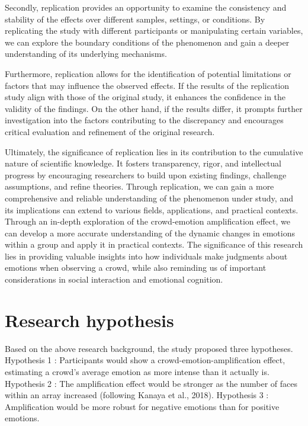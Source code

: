 \documentclass[
  man]{apa6}
\begin{document}
Secondly, replication provides an opportunity to examine the consistency and stability of the effects over different samples, settings, or conditions. By replicating the study with different participants or manipulating certain variables, we can explore the boundary conditions of the phenomenon and gain a deeper understanding of its underlying mechanisms.

Furthermore, replication allows for the identification of potential limitations or factors that may influence the observed effects. If the results of the replication study align with those of the original study, it enhances the confidence in the validity of the findings. On the other hand, if the results differ, it prompts further investigation into the factors contributing to the discrepancy and encourages critical evaluation and refinement of the original research.

Ultimately, the significance of replication lies in its contribution to the cumulative nature of scientific knowledge. It fosters transparency, rigor, and intellectual progress by encouraging researchers to build upon existing findings, challenge assumptions, and refine theories. Through replication, we can gain a more comprehensive and reliable understanding of the phenomenon under study, and its implications can extend to various fields, applications, and practical contexts.
Through an in-depth exploration of the crowd-emotion amplification effect, we can develop a more accurate understanding of the dynamic changes in emotions within a group and apply it in practical contexts. The significance of this research lies in providing valuable insights into how individuals make judgments about emotions when observing a crowd, while also reminding us of important considerations in social interaction and emotional cognition.

\hypertarget{research-hypothesis}{%
\section{Research hypothesis}\label{research-hypothesis}}

Based on the above research background, the study proposed three hypotheses.
Hypothesis 1 : Participants would show a crowd-emotion-amplification effect, estimating a crowd's average emotion as more intense than it actually is.
Hypothesis 2 : The amplification effect would be stronger as the number of faces within an array increased (following Kanaya et al., 2018).
Hypothesis 3 : Amplification would be more robust for negative emotions than for positive emotions.
\end{document}
